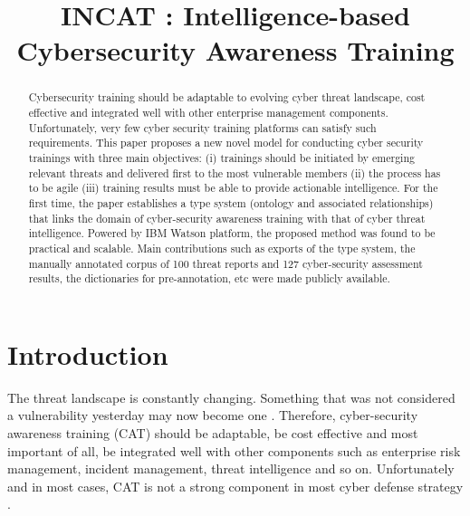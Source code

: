 \documentclass[conference]{IEEEtran}
\begin{document}
\title{INCAT : Intelligence-based Cybersecurity Awareness Training
}


\author{
}

\maketitle

\begin{abstract}
Cybersecurity training should be adaptable to evolving cyber threat landscape, cost effective and integrated well with other enterprise management components. Unfortunately, very few cyber security training platforms can satisfy such requirements. This paper proposes a new novel model for conducting cyber security trainings with three main objectives: (i) trainings should be initiated by emerging relevant threats and delivered first to the most vulnerable members (ii) the process has to be agile (iii) training results must be able to provide actionable intelligence. For the first time, the paper establishes a type system (ontology and associated relationships) that links the domain of cyber-security awareness training with that of cyber threat intelligence. Powered by IBM Watson platform, the proposed method was found to be practical and scalable. Main contributions such as exports of the type system, the manually annotated corpus of 100 threat reports and 127 cyber-security assessment results, the dictionaries for pre-annotation, etc were made publicly available.
\end{abstract}





%
\IEEEpeerreviewmaketitle

\section{Introduction}
The threat landscape is constantly changing. Something that was not considered a vulnerability yesterday may now become one \cite{Manadhata2011AnMetric}. Therefore, cyber-security awareness training (CAT) should be adaptable, be cost effective and most important of all, be integrated well with other components such as enterprise risk management, incident management, threat intelligence and so on. Unfortunately and in most cases, CAT is not a strong component in most cyber defense strategy \cite{Jakoubi2009AManagement}.
\end{document}
